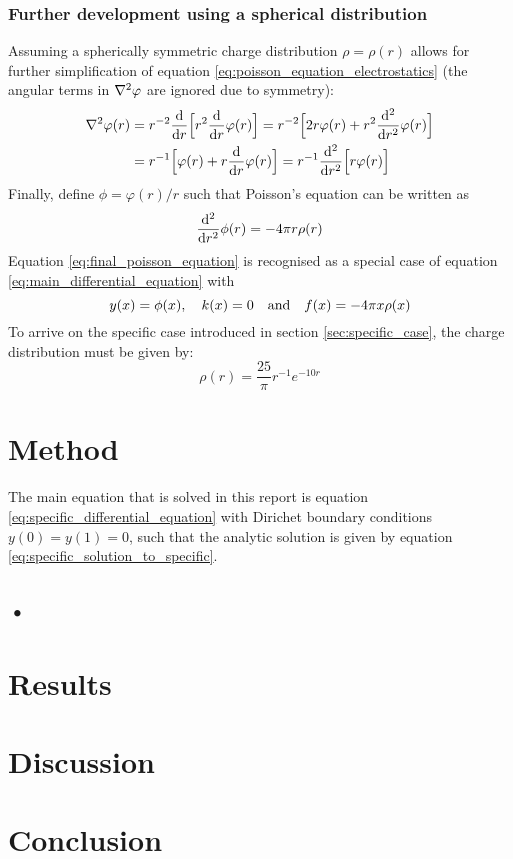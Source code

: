 \documentclass[reprint,english]{revtex4-1}
\begin{document}
\subsubsection{Further development using a spherical distribution}
Assuming a spherically symmetric charge distribution \(\rho=\rho(r)\) allows for further simplification of equation \eqref{eq:poisson_equation_electrostatics} (the angular terms in \(\laplacian\varphi\) are ignored due to symmetry):
\begin{align*}
\laplacian\varphi(r)&=r^{-2}\dv{r}\Big[r^2\dv{r}\varphi(r)\Big]=r^{-2}\Big[2r\varphi(r)+r^2\dv[2]{r}\varphi(r)\Big]\\
&=r^{-1}\Big[\varphi(r)+r\dv{r}\varphi(r)\Big]=r^{-1}\dv[2]{r}\Big[r\varphi(r)\Big]
\end{align*}
Finally, define \(\phi=\varphi(r)/r\) such that Poisson's equation can be written as
\begin{equation}\label{eq:final_poisson_equation}
\dv[2]{r}\phi(r)=-4\pi r\rho(r)
\end{equation}
Equation \eqref{eq:final_poisson_equation} is recognised as a special case of equation \eqref{eq:main_differential_equation} with
\[y(x)=\phi(x)\qcomma k(x)=0\qand f(x)=-4\pi x\rho(x)\]
To arrive on the specific case introduced in section \ref{sec:specific_case}, the charge distribution must be given by:
\[\rho(r)=\frac{25}{\pi}r^{-1}e^{-10r}\]
\section{Method}
The main equation that is solved in this report is equation \eqref{eq:specific_differential_equation} with Dirichet boundary conditions \(y(0)=y(1)=0\), such that the analytic solution is given by equation \eqref{eq:specific_solution_to_specific}.
\subsection{•}









\clearpage
\section{Results}
\section{Discussion}
\section{Conclusion}
\cite{dirac}\cite{einstein}


	 
\end{document}
